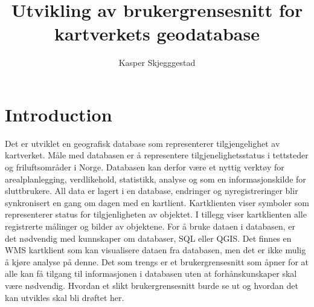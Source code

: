 \documentclass[a4paper,UKenglish]{article}
\title{Utvikling av brukergrensesnitt for kartverkets geodatabase}
\author{Kasper Skjegggestad}
\begin{document}
\maketitle
\tableofcontents

\section{Introduction}


Det er utviklet en geografisk database som representerer tilgjengelighet av kartverket. Måle med databasen er å representere tilgjenelighetsstatus i tettsteder og friluftsområder i Norge. Databasen kan derfor være et nyttig verktøy for arealplanlegging, verdlikehold, statistikk, analyse og som en informasjonskilde for sluttbrukere. All data er lagert i en database, endringer og nyregistreringer blir synkronisert en gang om dagen med en kartlient. Kartklienten viser symboler som representerer status for tilgjenligheten av objektet. I tillegg viser kartklienten alle registrerte målinger og bilder av objektene. For å bruke dataen i databasen, er det nødvendig med kunnskaper om databaser, SQL eller QGIS. Det finnes en WMS kartklient som kan visualisere dataen fra databasen, men det er ikke mulig å kjøre analyse på denne. Det som trengs er et brukergrensesnitt som åpner for at alle kan få tilgang til informasjonen i databasen uten at forhånskunskaper skal være nødvendig.
Hvordan et slikt brukergrensesnitt burde se ut og hvordan det kan utvikles skal bli drøftet her.
\end{document}
